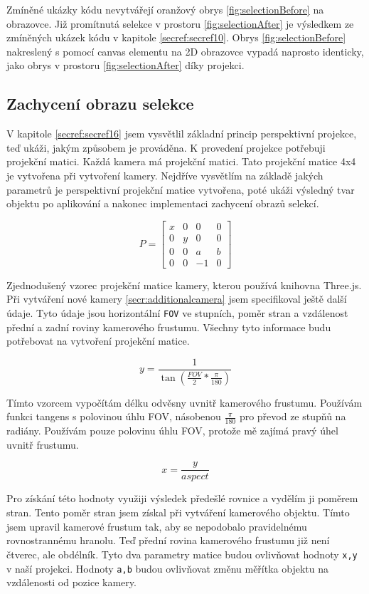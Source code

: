 \documentclass[czech,bachelor,dept420,male,cpdeclaration]{diploma}
\begin{document}
Zmíněné ukázky kódu nevytvářejí oranžový obrys \ref{fig:selectionBefore} na obrazovce. Již promítnutá selekce v prostoru \ref{fig:selectionAfter} je výsledkem ze zmíněných ukázek kódu v kapitole \ref{secref:secref10}. Obrys \ref{fig:selectionBefore} nakreslený s pomocí canvas elementu na 2D obrazovce vypadá naprosto identicky, jako obrys v prostoru \ref{fig:selectionAfter} díky projekci.


\subsection{Zachycení obrazu selekce}\label{secref:secref13} 
V kapitole \ref{secref:secref16} jsem vysvětlil základní princip perspektivní projekce, teď ukáži, jakým způsobem je prováděna. K provedení projekce potřebuji projekční matici. Každá kamera má projekční matici. Tato projekční matice 4x4 je vytvořena při vytvoření kamery. Nejdříve vysvětlím na základě jakých parametrů je perspektivní projekční matice vytvořena, poté ukáži výsledný tvar objektu po aplikování a nakonec implementaci zachycení obrazů selekcí. 

\begin{equation}
		P =
		\begin{bmatrix}%
    x & 0 & 0 & 0 \\
		0 & y & 0 & 0 \\ 
		0 & 0 & a & b \\
		0 & 0 & -1 & 0 
    \end{bmatrix}
\label{eq:eq4}
\end{equation}


Zjednodušený vzorec projekční matice kamery, kterou používá knihovna Three.js. Při vytváření nové kamery \ref{secr:additionalcamera} jsem specifikoval ještě další údaje. Tyto údaje jsou horizontální \texttt{FOV} ve stupních, poměr stran a vzdálenost přední a zadní roviny kamerového frustumu. Všechny tyto informace budu potřebovat na vytvoření projekční matice. 

$$y = \frac{1}{\tan(\frac{FOV}{2} * \frac{\pi}{180})}$$ 

Tímto vzorcem vypočítám délku odvěsny uvnitř kamerového frustumu. Používám funkci tangens s polovinou úhlu FOV, násobenou $\frac{\pi}{180}$ pro převod ze stupňů na radiány. Používám pouze polovinu úhlu FOV, protože mě zajímá pravý úhel uvnitř frustumu. 

$$x = \frac{y}{aspect}$$ 

Pro získání této hodnoty využiji výsledek předešlé rovnice a vydělím ji poměrem stran. Tento poměr stran jsem získal při vytváření kamerového objektu. Tímto jsem upravil kamerové frustum tak, aby se nepodobalo pravidelnému rovnostrannému hranolu. Teď přední rovina kamerového frustumu již není čtverec, ale obdélník. Tyto dva parametry matice budou ovlivňovat hodnoty \texttt{x,y} v naší projekci. Hodnoty \texttt{a,b} budou ovlivňovat změnu měřítka objektu na vzdálenosti od pozice kamery. 
\end{document}
